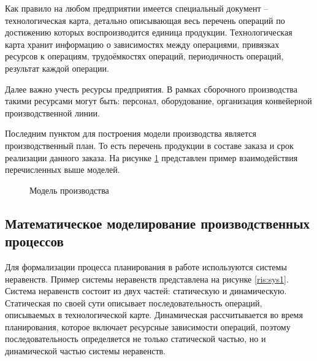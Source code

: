 Как правило на любом предприятии имеется специальный документ – технологическая карта, детально описывающая весь перечень операций по достижению которых воспроизводится единица продукции. Технологическая карта хранит информацию о зависимостях между операциями, привязках ресурсов к операциям, трудоёмкостях операций, периодичность операций, результат каждой операции. 

Далее важно учесть ресурсы предприятия. В рамках сборочного производства такими ресурсами могут быть: персонал, оборудование, организация конвейерной производственной линии.

Последним пунктом для построения модели производства является производственный план. То есть перечень продукции в составе заказа и срок реализации данного заказа. На рисунке \ref{ris:Prod1} представлен пример взаимодействия перечисленных выше моделей. 

\begin{figure}[H]
    \caption{Модель производства}
    \label{ris:Prod1}
\end{figure}

\subsection{Математическое моделирование производственных процессов}

Для формализации процесса планирования в работе используются системы неравенств. Пример системы неравенств представлена на рисунке \ref{ris:sys1}. Система неравенств состоит из двух частей: статическую и динамическую. Статическая по своей сути описывает последовательность операций, описываемых в технологической карте. Динамическая рассчитывается во время планирования, которое включает ресурсные зависимости операций, поэтому последовательность определяется не только статической частью, но и динамической частью системы неравенств. 

